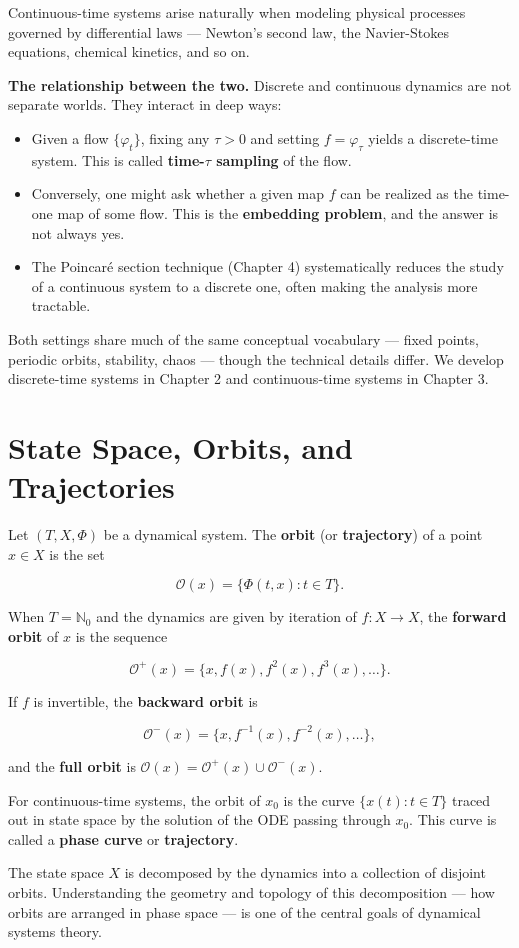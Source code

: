 Continuous-time systems arise naturally when modeling physical processes governed by differential laws --- Newton's second law, the Navier-Stokes equations, chemical kinetics, and so on.

\textbf{The relationship between the two.} Discrete and continuous dynamics are not separate worlds. They interact in deep ways:

\begin{itemize}[nosep]
  \item Given a flow $\{\varphi_t\}$, fixing any $\tau > 0$ and setting $f = \varphi_\tau$ yields a discrete-time system. This is called \textbf{time-$\tau$ sampling} of the flow.
  \item Conversely, one might ask whether a given map $f$ can be realized as the time-one map of some flow. This is the \textbf{embedding problem}, and the answer is not always yes.
  \item The Poincaré section technique (Chapter 4) systematically reduces the study of a continuous system to a discrete one, often making the analysis more tractable.
\end{itemize}

Both settings share much of the same conceptual vocabulary --- fixed points, periodic orbits, stability, chaos --- though the technical details differ. We develop discrete-time systems in Chapter 2 and continuous-time systems in Chapter 3.


\section{State Space, Orbits, and Trajectories}\label{sec:1.3}

\begin{definition}[Orbit]\label{def:1.2}
Let $(T, X, \Phi)$ be a dynamical system. The \textbf{orbit} (or \textbf{trajectory}) of a point $x \in X$ is the set

\[
\mathcal{O}(x) = \{\Phi(t, x) : t \in T\}.
\]

When $T = \mathbb{N}_0$ and the dynamics are given by iteration of $f: X \to X$, the \textbf{forward orbit} of $x$ is the sequence

\[
\mathcal{O}^+(x) = \{x, f(x), f^2(x), f^3(x), \ldots\}.
\]

If $f$ is invertible, the \textbf{backward orbit} is

\[
\mathcal{O}^-(x) = \{x, f^{-1}(x), f^{-2}(x), \ldots\},
\]

and the \textbf{full orbit} is $\mathcal{O}(x) = \mathcal{O}^+(x) \cup \mathcal{O}^-(x)$.

For continuous-time systems, the orbit of $x_0$ is the curve $\{x(t) : t \in T\}$ traced out in state space by the solution of the ODE passing through $x_0$. This curve is called a \textbf{phase curve} or \textbf{trajectory}.

The state space $X$ is decomposed by the dynamics into a collection of disjoint orbits. Understanding the geometry and topology of this decomposition --- how orbits are arranged in phase space --- is one of the central goals of dynamical systems theory.
\end{definition}


